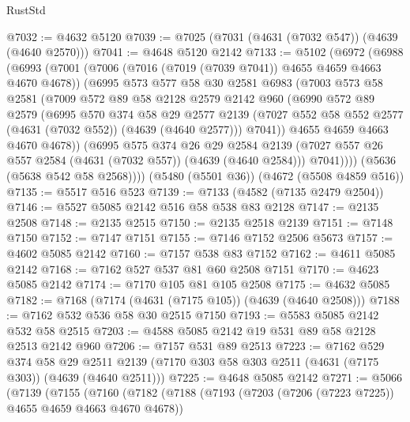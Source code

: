 \begin{lexlean}{RustStd}
\begin{coremodule}
{\begin{coremodule}
{{{{{{{{{{{{{{{{@7032 := @4632 @5120
@7039 := @7025 (@7031 (@4631 (@7032 @547)) (@4639 (@4640 @2570)))
@7041 := @4648 @5120 @2142
@7133 := @5102
    (@6972
      (@6988
        (@6993
          (@7001
            (@7006 (@7016 (@7019 (@7039 @7041)) @4655 @4659 @4663 @4670 @4678))
            (@6995
              @573
              @577
              @58
              @30
              @2581
              @6983
              (@7003
                @573
                @58
                @2581
                (@7009
                  @572
                  @89
                  @58
                  @2128
                  @2579
                  @2142
                  @960
                  (@6990
                    @572
                    @89
                    @2579
                    (@6995
                      @570
                      @374
                      @58
                      @29
                      @2577
                      @2139
                      (@7027 @552 @58 @552 @2577 (@4631 (@7032 @552)) (@4639 (@4640 @2577)))
                      @7041))
                  @4655
                  @4659
                  @4663
                  @4670
                  @4678))
              (@6995
                @575
                @374
                @26
                @29
                @2584
                @2139
                (@7027 @557 @26 @557 @2584 (@4631 (@7032 @557)) (@4639 (@4640 @2584)))
                @7041))))
        (@5636 (@5638 @542 @58 @2568))))
    (@5480 (@5501 @36))
    (@4672 (@5508 @4859 @516))
@7135 := @5517 @516 @523
@7139 := @7133 (@4582 (@7135 @2479 @2504))
@7146 := @5527 @5085 @2142 @516 @58 @538 @83 @2128
@7147 := @2135 @2508
@7148 := @2135 @2515
@7150 := @2135 @2518 @2139
@7151 := @7148 @7150
@7152 := @7147 @7151
@7155 := @7146 @7152 @2506 @5673
@7157 := @4602 @5085 @2142
@7160 := @7157 @538 @83 @7152
@7162 := @4611 @5085 @2142
@7168 := @7162 @527 @537 @81 @60 @2508 @7151
@7170 := @4623 @5085 @2142
@7174 := @7170 @105 @81 @105 @2508
@7175 := @4632 @5085
@7182 := @7168 (@7174 (@4631 (@7175 @105)) (@4639 (@4640 @2508)))
@7188 := @7162 @532 @536 @58 @30 @2515 @7150
@7193 := @5583 @5085 @2142 @532 @58 @2515
@7203 := @4588 @5085 @2142 @19 @531 @89 @58 @2128 @2513 @2142 @960
@7206 := @7157 @531 @89 @2513
@7223 := @7162
    @529
    @374
    @58
    @29
    @2511
    @2139
    (@7170 @303 @58 @303 @2511 (@4631 (@7175 @303)) (@4639 (@4640 @2511)))
@7225 := @4648 @5085 @2142
@7271 := @5066
    (@7139
      (@7155
        (@7160
          (@7182
            (@7188
              (@7193 (@7203 (@7206 (@7223 @7225)) @4655 @4659 @4663 @4670 @4678))
}}}}}}}}}}}}}}}}
\end{coremodule}}
\end{coremodule}
\end{lexlean}
